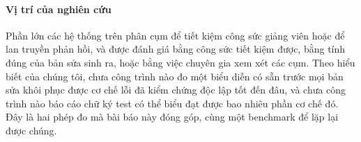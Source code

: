 \paragraph{Vị trí của nghiên cứu}
Phần lớn các hệ thống trên phân cụm để tiết kiệm công sức giảng viên hoặc để lan truyền phản hồi, và được đánh giá bằng công sức tiết kiệm được, bằng tính đúng của bản sửa sinh ra, hoặc bằng việc chuyên gia xem xét các cụm. Theo hiểu biết của chúng tôi, chưa công trình nào đo một biểu diễn có sẵn trước mọi bản sửa khôi phục được cơ chế lỗi đã kiểm chứng độc lập tốt đến đâu, và chưa công trình nào báo cáo chữ ký test có thể biểu đạt được bao nhiêu phần cơ chế đó. Đây là hai phép đo mà bài báo này đóng góp, cùng một benchmark để lặp lại được chúng.
